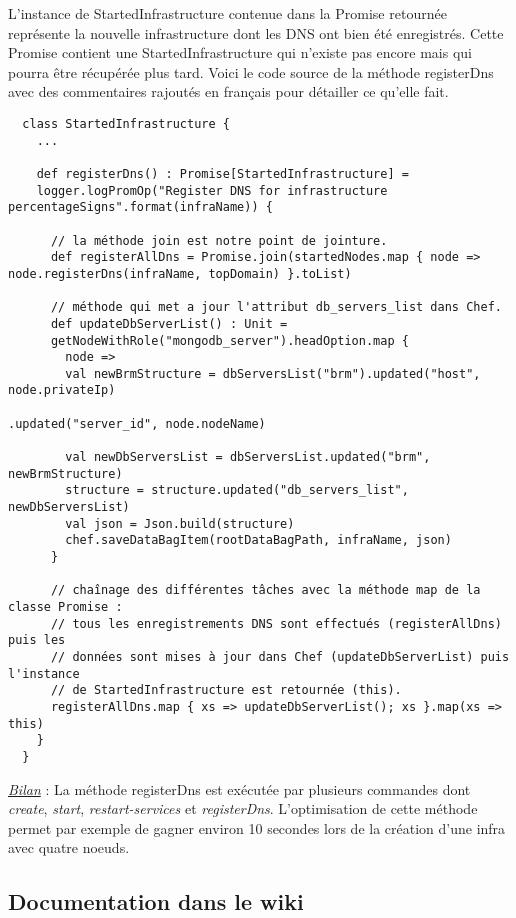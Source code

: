 L'instance de StartedInfrastructure contenue dans la Promise retournée
représente la nouvelle infrastructure dont les DNS ont bien été enregistrés.
Cette Promise contient une StartedInfrastructure qui n'existe pas encore mais
qui pourra être récupérée plus tard.
Voici le code source de la méthode registerDns avec des commentaires rajoutés en
français pour détailler ce qu'elle fait.
\lstset{language=Scala}
\begin{lstlisting}
  class StartedInfrastructure {
    ...

    def registerDns() : Promise[StartedInfrastructure] = 
    logger.logPromOp("Register DNS for infrastructure percentageSigns".format(infraName)) {

      // la méthode join est notre point de jointure.
      def registerAllDns = Promise.join(startedNodes.map { node => node.registerDns(infraName, topDomain) }.toList)

      // méthode qui met a jour l'attribut db_servers_list dans Chef.
      def updateDbServerList() : Unit =
      getNodeWithRole("mongodb_server").headOption.map { 
        node =>
        val newBrmStructure = dbServersList("brm").updated("host", node.privateIp)
                                                  .updated("server_id", node.nodeName)

        val newDbServersList = dbServersList.updated("brm", newBrmStructure)
        structure = structure.updated("db_servers_list", newDbServersList)
        val json = Json.build(structure)
        chef.saveDataBagItem(rootDataBagPath, infraName, json)
      }

      // chaînage des différentes tâches avec la méthode map de la classe Promise :
      // tous les enregistrements DNS sont effectués (registerAllDns) puis les
      // données sont mises à jour dans Chef (updateDbServerList) puis l'instance 
      // de StartedInfrastructure est retournée (this).
      registerAllDns.map { xs => updateDbServerList(); xs }.map(xs => this)
    }
  }
\end{lstlisting}

\underline{\textit{Bilan}} : La méthode registerDns est exécutée par plusieurs commandes
dont \textit{create}, \textit{start}, \textit{restart-services} et
\textit{registerDns}. L'optimisation de cette méthode permet par exemple de
gagner environ 10 secondes lors de la création d'une infra avec quatre noeuds.

\subsection{Documentation dans le wiki}

